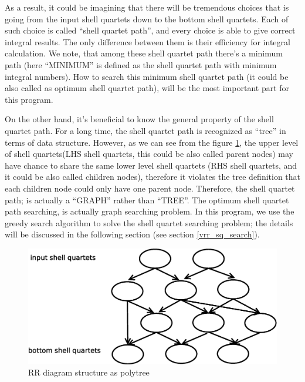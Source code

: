 As a result, it could be imagining that there will be tremendous
choices that is going from the input shell quartets down to the 
bottom shell quartets. Each of such choice is called ``shell quartet 
path'', and every choice is able to give correct integral results.
The only difference between them is their efficiency for integral calculation. 
We note, that among these shell quartet path there's a minimum 
path (here ``MINIMUM'' is defined as the shell quartet path with
minimum integral numbers). How to search this minimum shell quartet
path (it could be also called as optimum shell quartet path), 
will be the most important part for this program.

On the other hand, it's beneficial to know the general property
of the shell quartet path. For a long time, the shell quartet path
is recognized as ``tree'' in terms of data structure\cite{HGP}. However, as 
we can see from the figure \ref{fig:2}, the upper level of shell 
quartets(LHS shell quartets, this could be also called parent nodes) 
may have chance to share the same lower level shell quartets (RHS shell quartets,
and it could be also called children nodes), therefore it violates
the tree definition that each children node could only have one 
parent node. Therefore, the shell quartet path; is actually a ``GRAPH''
rather than ``TREE''. The optimum shell quartet path searching,
is actually graph searching problem. In this program, we use 
the greedy search algorithm to solve the shell quartet searching
problem; the details will be discussed in the following section (see 
section \ref{vrr_sq_search}).

 \begin{figure}[htb]
 \centering
 \includegraphics[scale=0.5]{./rr_as_polytree.eps}
 \caption{RR diagram structure as polytree}
 \label{fig:2}
\end{figure}

